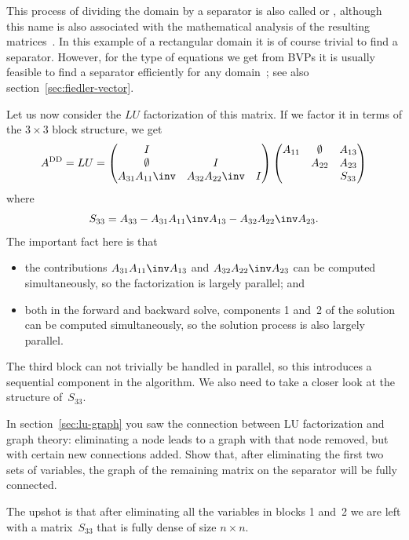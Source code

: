 This process of dividing the domain by a separator is also called
 or ,
although this name is also associated with the mathematical analysis
of the resulting matrices~\cite{BGSm:96}. In this example of a
rectangular domain it is of course trivial to find a
separator. However, for the type of equations we get from \acp{BVP} it
is usually feasible to find a separator
efficiently for any domain~\cite{LiTa:separator}; 
see also section~\ref{sec:fiedler-vector}.

Let us now consider the $LU$ factorization of this matrix. If we
factor it in terms of the $3\times 3$ block structure, we get
\[
  \Add=LU=
  \begin{pmatrix}
    I\\
    \emptyset&I\\
    A_{31}A_{11}\inv&A_{32}A_{22}\inv&I
  \end{pmatrix}
  \begin{pmatrix}
    A_{11}&\emptyset&A_{13}\\
         &A_{22}&A_{23}\\
    &&S_{33}
  \end{pmatrix}
\]
where \[ S_{33}=A_{33}-A_{31}A_{11}\inv A_{13}-A_{32}A_{22}\inv A_{23}. \]
The important fact here is that 
\begin{itemize}
\item the contributions $A_{31}A_{11}\inv A_{13}$ and
  $A_{32}A_{22}\inv A_{23}$ can be computed simultaneously, so the
  factorization is largely parallel; and
\item both in the forward and backward solve, components 1 and~2 of
  the solution can be computed simultaneously, so the solution process
  is also largely parallel.
\end{itemize}
The third block can not trivially be handled in parallel, so this
introduces a sequential component in the algorithm. We also need to
take a closer look at the structure of~$S_{33}$.

\begin{exercise}
  In section~\ref{sec:lu-graph} you saw the connection between LU
  factorization and graph theory: eliminating a node leads to a graph
  with that node removed, but with certain new connections added.
  Show that, after eliminating the
  first two sets of variables, the graph of the remaining matrix on
  the separator will be fully connected.
\end{exercise}

The upshot is that after eliminating all the variables in blocks 1
and~2 we are left with a matrix~$S_{33}$ that is fully
dense of size $n\times n$. 

